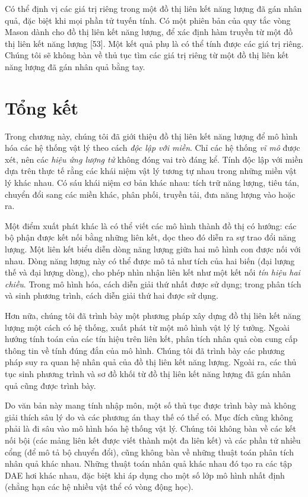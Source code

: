 Có thể định vị các giá trị riêng trong một đồ thị liên kết năng lượng đã gán nhân quả, đặc biệt khi mọi phần tử tuyến tính. Có một phiên bản của quy tắc vòng Mason dành cho đồ thị liên kết năng lượng, để xác định hàm truyền từ một đồ thị liên kết năng lượng [53]. Một kết quả phụ là có thể tính được các giá trị riêng. Chúng tôi sẽ không bàn về thủ tục tìm các giá trị riêng từ một đồ thị liên kết năng lượng đã gán nhân quả bằng tay.
\section{Tổng kết}
Trong chương này, chúng tôi đã giới thiệu đồ thị liên kết năng lượng để mô hình hóa các hệ thống vật lý theo cách \emph{độc lập với miền}. Chỉ các hệ thống \emph{vĩ mô} được xét, nên các \emph{hiệu ứng lượng tử} không đóng vai trò đáng kể. Tính độc lập với miền dựa trên thực tế rằng các khái niệm vật lý tương tự nhau trong những miền vật lý khác nhau. Có sáu khái niệm cơ bản khác nhau: tích trữ năng lượng, tiêu tán, chuyển đổi sang các miền khác, phân phối, truyền tải, đưa năng lượng vào hoặc ra.

Một điểm xuất phát khác là có thể viết các mô hình thành đồ thị có hướng: các bộ phận được kết nối bằng những liên kết, dọc theo đó diễn ra sự trao đổi năng lượng. Một liên kết biểu diễn dòng năng lượng giữa hai mô hình con được nối với nhau. Dòng năng lượng này có thể được mô tả như tích của hai biến (đại lượng thế và đại lượng dòng), cho phép nhìn nhận liên kết như một kết nối \emph{tín hiệu hai chiều}. Trong mô hình hóa, cách diễn giải thứ nhất được sử dụng; trong phân tích và sinh phương trình, cách diễn giải thứ hai được sử dụng.

Hơn nữa, chúng tôi đã trình bày một phương pháp xây dựng đồ thị liên kết năng lượng một cách có hệ thống, xuất phát từ một mô hình vật lý lý tưởng. Ngoài hướng tính toán của các tín hiệu trên liên kết, phân tích nhân quả còn cung cấp thông tin về tính đúng đắn của mô hình. Chúng tôi đã trình bày các phương pháp suy ra quan hệ nhân quả của đồ thị liên kết năng lượng. Ngoài ra, các thủ tục sinh phương trình và sơ đồ khối từ đồ thị liên kết năng lượng đã gán nhân quả cũng được trình bày.

Do văn bản này mang tính nhập môn, một số thủ tục được trình bày mà không giải thích sâu lý do và các phương án thay thế có thể có. Mục đích cũng không phải là đi sâu vào mô hình hóa hệ thống vật lý. Chúng tôi không bàn về các kết nối bội (các mảng liên kết được viết thành một đa liên kết) và các phần tử nhiều cổng (để mô tả bộ chuyển đổi), cũng không bàn về những thuật toán phân tích nhân quả khác nhau. Những thuật toán nhân quả khác nhau đó tạo ra các tập DAE hơi khác nhau, đặc biệt khi áp dụng cho một số lớp mô hình nhất định (chẳng hạn các hệ nhiều vật thể có vòng động học).

